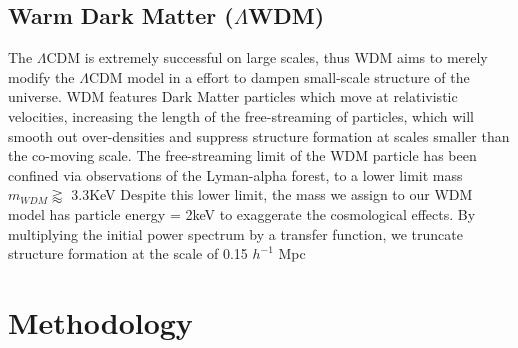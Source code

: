 \documentclass[a4paper,fleqn,usenatbib]{mnras}
\def \lcdm{$\Lambda$CDM }
\def \qcdm{$\phi$CDM }
\begin{document}
\subsection{Warm Dark Matter  ($\Lambda$WDM)}\label{wdm}
The \lcdm is extremely successful on large scales, thus WDM aims to merely modify the \lcdm model in a effort to dampen small-scale structure of the universe. WDM features Dark Matter particles which move at relativistic velocities, increasing the length of the free-streaming of particles, which will smooth out over-densities and suppress structure formation at scales smaller than the co-moving scale\citep{Bode_01}.
The free-streaming limit of the WDM particle has been confined via observations of the Lyman-alpha forest, to a lower limit mass $m_{WDM}\gtrapprox$ 3.3KeV \citep{Viel_13} Despite this lower limit, the mass we assign to our WDM model has particle energy = 2keV to exaggerate the cosmological effects. By multiplying the initial power spectrum by a transfer function, we truncate structure formation at the scale of 0.15 $h^{-1}$ Mpc \citep{Bode_01}

\section{Methodology}\label{SiriusBlack}\label{method}

\begin{comment}
\begin{table}
	\centering
	\caption{Cosmological parameters for reference cosmology ($\Lambda$CDM) as well as WMD \& \qcdm}
	\label{tab:1}
	\begin{tabular}{lccr} %
		\hline
		Model & $\Omega_{m}$ & $\Omega_{b}$ & $\sigma_{g}$  \\
		\hline
		$\Lambda$CDM(ref.) & 0.3175 & 0.049 & 0.83\\
		WDM & $512^{3}$ & 8.16$\times$$10^{10}$ & 8 \\
		\qcdm & $512^{3}$ & 8.16$\times$$10^{10}$ & 9 \\
		\hline
	\end{tabular}
\end{table}
\end{comment}
\end{document}
